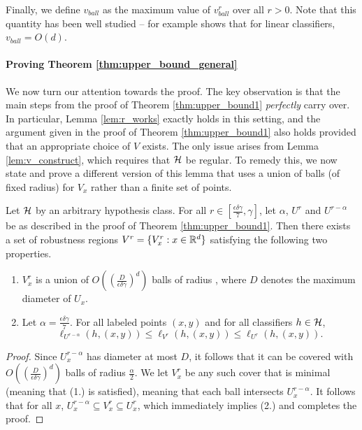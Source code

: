 Finally, we define $v_{ball}$ as the maximum value of $v_{ball}^r$ over all $r > 0$. Note that this quantity has been well studied -- for example \cite{Cullina18} shows that for linear classifiers, $v_{ball} = O(d)$. 

\paragraph{Proving Theorem \ref{thm:upper_bound_general}} We now turn our attention towards the proof. The key observation is that the main steps from the proof of Theorem \ref{thm:upper_bound1} \textit{perfectly} carry over. In particular, Lemma \ref{lem:r_works} exactly holds in this setting, and the argument given in the proof of Theorem \ref{thm:upper_bound1} also holds provided that an appropriate choice of $V$ exists. The only issue arises from Lemma \ref{lem:v_construct}, which requires that $\mathcal H$ be regular. To remedy this, we now state and prove a different version of this lemma that uses a union of balls (of fixed radius) for $V_x$ rather than a finite set of points. 

\begin{lem}\label{lem:v_construct_new}
Let $\mathcal H$ by an arbitrary hypothesis class. For all $r \in [\frac{\epsilon\delta\gamma}{7}, \gamma]$, let $\alpha$, $U^r$ and $U^{r-\alpha}$ be as described in the proof of Theorem \ref{thm:upper_bound1}. Then there exists a set of robustness regions $V^r = \{V_x^r: x \in \mathbb{R}^d\}$ satisfying the following two properties.  
\begin{enumerate}
	\item $V_x^r$ is a union of $O\left(\left(\frac{D}{\epsilon\delta\gamma}\right)^d\right)$ balls of radius , where $D$ denotes the maximum diameter of $U_x$. 
	\item Let $\alpha = \frac{\epsilon\delta\gamma}{7}$. For all labeled points $(x,y)$ and for all classifiers $h \in \mathcal H$, $$\ell_{U^{r - \alpha}}(h, (x,y)) \leq \ell_{V^r}(h, (x,y)) \leq \ell_{U^r}(h, (x,y)).$$
\end{enumerate}
\end{lem}

\begin{proof}
Since $U_x^{r-\alpha}$ has diameter at most $D$, it follows that it can be covered with $O\left(\left(\frac{D}{\epsilon\delta\gamma}\right)^d\right)$ balls of radius $\frac{\alpha}{2}$. We let $V_x^r$ be any such cover that is minimal (meaning that (1.) is satisfied), meaning that each ball intersects $U_x^{r-\alpha}$. It follows that for all $x$, $U_x^{r-\alpha} \subseteq V_x^r \subseteq U_x^r$, which immediately implies (2.) and completes the proof. 
\end{proof}

